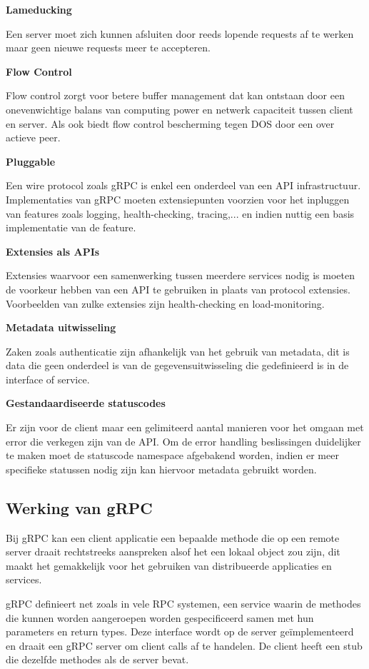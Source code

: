 \textbf{Lameducking}

Een server moet zich kunnen afsluiten door reeds lopende requests af te werken maar geen nieuwe requests meer te accepteren.

\textbf{Flow Control}

Flow control zorgt voor betere buffer management dat kan ontstaan door een onevenwichtige balans van computing power en netwerk capaciteit tussen client en server. Als ook biedt flow control bescherming tegen DOS door een over actieve peer.

\textbf{Pluggable}

Een wire protocol zoals gRPC is enkel een onderdeel van een API infrastructuur. Implementaties van gRPC moeten extensiepunten voorzien voor het inpluggen van features zoals logging, health-checking, tracing,... en indien nuttig een basis implementatie van de feature.

\textbf{Extensies als APIs}

Extensies waarvoor een samenwerking tussen meerdere services nodig is moeten de voorkeur hebben van een API te gebruiken in plaats van protocol extensies. Voorbeelden van zulke extensies zijn health-checking en load-monitoring.

\textbf{Metadata uitwisseling}

Zaken zoals authenticatie zijn afhankelijk van het gebruik van metadata, dit is data die geen onderdeel is van de gegevensuitwisseling die gedefinieerd is in de interface of service.

\textbf{Gestandaardiseerde statuscodes}

Er zijn voor de client maar een gelimiteerd aantal manieren voor het omgaan met error die verkegen zijn van de API. Om de error handling beslissingen duidelijker te maken moet de statuscode namespace afgebakend worden, indien er meer specifieke statussen nodig zijn kan hiervoor metadata gebruikt worden.

\subsection{Werking van gRPC}
\label{subsec: Werking van gRPC}

Bij gRPC kan een client applicatie een bepaalde methode die op een remote server draait rechtstreeks aanspreken alsof het een lokaal object zou zijn, dit maakt het gemakkelijk voor het gebruiken van distribueerde applicaties en services.

gRPC definieert net zoals in vele RPC systemen, een service waarin de methodes die kunnen worden aangeroepen worden gespecificeerd samen met hun parameters en return types. Deze interface wordt op de server geïmplementeerd en draait een gRPC server om client calls af te handelen. De client heeft een stub die dezelfde methodes als de server bevat.

